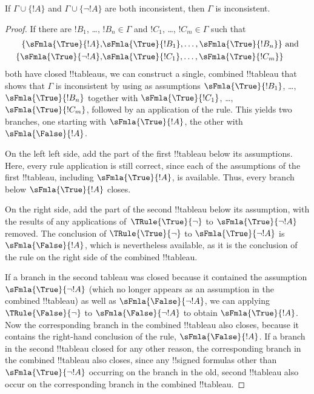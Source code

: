 \begin{prop}
  If $\Gamma \cup \{!A\}$ and $\Gamma \cup \{\lnot !A\}$ are both
  inconsistent, then $\Gamma$ is inconsistent.
\end{prop}

\begin{proof}
  If there are $!B_1$, \dots, $!B_n \in \Gamma$ and $!C_1$, \dots,
  $!C_m \in \Gamma$ such that
  \begin{align*}
    \{\sFmla{\True}{!A}, &
    \sFmla{\True}{!B_1}, \dots, \sFmla{\True}{!B_n}\} \text{ and}\\
    \{\sFmla{\True}{\lnot !A}, &
    \sFmla{\True}{!C_1}, \dots, \sFmla{\True}{!C_m}\}
  \end{align*}
  both have closed !!{tableau}s, we can construct a single, combined
  !!{tableau} that shows that $\Gamma$ is inconsistent by using as
  assumptions $\sFmla{\True}{!B_1}$, \dots, $\sFmla{\True}{!B_n}$
  together with $\sFmla{\True}{!C_1}$, \dots, $\sFmla{\True}{!C_m}$,
  followed by an application of the \Cut{} rule. This yields two
  branches, one starting with $\sFmla{\True}{!A}$, the other with
  $\sFmla{\False}{!A}$.  
  
  On the left left side, add the part of the first
  !!{tableau} below its assumptions. Here, every rule application is still
  correct, since each of the assumptions of the first !!{tableau},
  including $\sFmla{\True}{!A}$, is available. Thus, every branch
  below $\sFmla{\True}{!A}$ closes. 
  
  On the right side, add the part of the second !!{tableau} below its
  assumption, with the results of any applications
  of~$\TRule{\True}{\lnot}$ to $\sFmla{\True}{\lnot !A}$ removed.  The
  conclusion of $\TRule{\True}{\lnot}$ to $\sFmla{\True}{\lnot !A}$ is
  $\sFmla{\False}{!A}$, which is nevertheless available, as it is the
  conclusion of the \Cut{} rule on the right side of the combined !!{tableau}.

  If a branch in the second tableau was closed because it contained
  the assumption $\sFmla{\True}{\lnot !A}$ (which no longer appears as
  an assumption in the combined !!{tableau}) as well as
  $\sFmla{\False}{\lnot !A}$, we can applying $\TRule{\False}{\lnot}$
  to $\sFmla{\False}{\lnot !A}$ to obtain $\sFmla{\True}{!A}$. Now the
  corresponding branch in the combined !!{tableau} also closes,
  because it contains the right-hand conclusion of the \Cut{} rule,
  $\sFmla{\False}{!A}$. If a branch in the second !!{tableau} closed
  for any other reason, the corresponding branch in the combined
  !!{tableau} also closes, since any !!{signed formula}s other than
  $\sFmla{\True}{\lnot !A}$ occurring on the branch in the old, second
  !!{tableau} also occur on the corresponding branch in the combined
  !!{tableau}.
  \end{proof}





